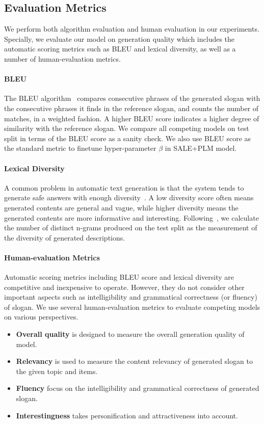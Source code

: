 \subsection{Evaluation Metrics}
\label{sec:metrics}
We perform both algorithm evaluation and human evaluation
in our experiments.
Specially, we evaluate our model on generation quality which includes
the automatic scoring metrics such as
BLEU and lexical diversity,
as well as a number of human-evaluation metrics.

\paragraph{BLEU}
The BLEU algorithm~\cite{papineni2002bleu} compares consecutive phrases of the 
generated slogan with the consecutive phrases it finds
in the reference slogan, and counts the number of matches, in a weighted fashion.
A higher BLEU score indicates a higher degree of similarity with the reference
slogan.
We compare all competing models on test split in terms of the BLEU score as a sanity check.
We also use BLEU score as the standard metric to finetune
hyper-parameter $\beta$ in SALE+PLM model.

\paragraph{Lexical Diversity}
A common problem in automatic text generation is that the system tends to generate safe
answers with enough diversity~\cite{li2016deep}.
A low diversity score often means generated contents are general and vague, 
while higher diversity means the generated contents are more informative and 
interesting.
Following~\cite{ChenLZYZ019}, we calculate the number of distinct n-grams produced on the test split
as the measurement of the diversity of generated descriptions.

\paragraph{Human-evaluation Metrics}
Automatic scoring metrics including BLEU score and lexical diversity are competitive and inexpensive to operate.
However, they do not consider
other important aspects such as intelligibility and grammatical correctness (or fluency) of slogan.
We use several human-evaluation metrics
to evaluate competing models on various perspectives.
\begin{itemize}
	\item \textbf{Overall quality} is designed to measure the
	overall generation quality of model.
	\item \textbf{Relevancy} is used to measure the content relevancy of generated slogan to the given topic and items.
	\item \textbf{Fluency} focus on the intelligibility and grammatical correctness of generated slogan.
	\item \textbf{Interestingness} takes personification and attractiveness into account.
\end{itemize}


